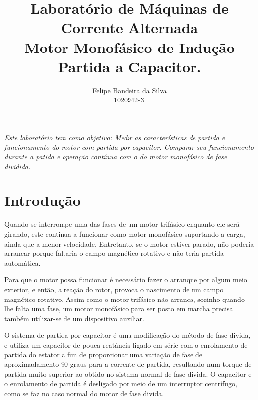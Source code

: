 \documentclass[paper=a4, fontsize=11pt]{article}
\title{Laboratório de Máquinas de Corrente Alternada\\Motor Monofásico de Indução Partida a Capacitor.}
\author{Felipe Bandeira da Silva\\1020942-X}
\begin{document}
\maketitle


\textit{Este laboratório tem como objetivo: Medir as características de partida
e funcionamento do motor com partida por capacitor. Comparar seu funcionamento
durante a patida e operação contínua com o do motor monofásico de fase dividida.}

\newpage

\tableofcontents

\newpage



\newpage
\section{Introdução}

Quando se interrompe uma das fases de um motor trifásico enquanto ele
será girando, este continua a funcionar como motor monofásico suportando
a carga, ainda que a menor velocidade. Entretanto, se o motor estiver
parado, não poderia arrancar porque faltaria o campo magnético rotativo
e não teria partida automática. 

Para que o motor possa funcionar é 
necessário fazer o arranque por algum meio exterior, e então, a reação
do rotor, provoca o nascimento de um campo magnético rotativo.
Assim como o motor trifásico não arranca, sozinho quando lhe falta
uma fase, um motor monofásico para ser posto em marcha precisa também 
utilizar-se de um dispositivo auxiliar.

O sistema de partida por capacitor é uma modificação do método de 
fase divida, e utiliza um capacitor de pouca reatância ligado em série
com o enrolamento de partida do estator a fim de proporcionar uma
variação de fase de aproximadamento 90 graus para a corrente de partida,
resultando num torque de partida muito superior ao obtido no sistema
normal de fase divida. 
O capacitor e o enrolamento de partida é desligado por meio de um 
interruptor centrífugo, como se faz no caso normal do motor de fase divida.

\end{document}
